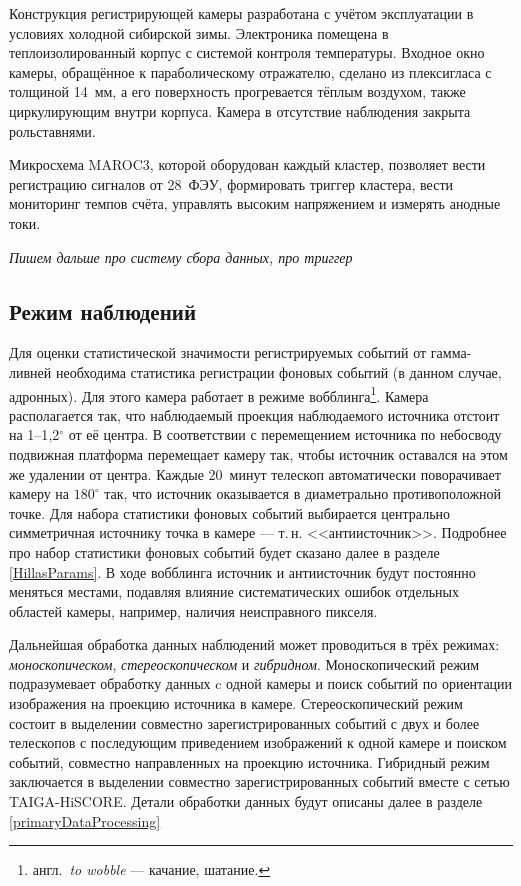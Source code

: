 \documentclass[magd,floatypics,numeref]{msudipl} %
\begin{document}
Конструкция регистрирующей камеры разработана с учётом эксплуатации в условиях холодной сибирской зимы. Электроника помещена в теплоизолированный корпус с системой контроля температуры. Входное окно камеры, обращённое к параболическому отражателю, сделано из плексигласа с толщиной 14~мм, а его поверхность прогревается тёплым воздухом, также циркулирующим внутри корпуса. Камера в отсутствие наблюдения закрыта рольставнями.

Микросхема MAROC3, которой оборудован каждый кластер, позволяет вести регистрацию сигналов от 28~ФЭУ, формировать триггер кластера, вести мониторинг темпов счёта, управлять высоким напряжением и измерять анодные токи. 

\textit{Пишем дальше про систему сбора данных, про триггер}
\subsection{Режим наблюдений}
Для оценки статистической значимости регистрируемых событий от гамма-ливней необходима статистика регистрации фоновых событий (в данном случае, адронных). Для этого камера работает в режиме вобблинга\footnote{англ.~\textit{to wobble} --- качание, шатание.}. Камера располагается так, что наблюдаемый проекция наблюдаемого источника отстоит на 1--1{,}2$^{\circ}$ от её центра. В соответствии с перемещением источника по небосводу подвижная платформа перемещает камеру так, чтобы источник оставался на этом же удалении от центра. Каждые 20~минут телескоп автоматически поворачивает камеру на $180^{\circ}$ так, что источник оказывается в диаметрально противоположной точке. Для набора статистики фоновых событий  выбирается центрально симметричная источнику точка в камере --- т.\,н. <<антиисточник>>. Подробнее про набор статистики фоновых событий будет сказано далее в разделе \ref{HillasParams}. В ходе вобблинга источник и антиисточник будут постоянно меняться местами, подавляя влияние систематических ошибок отдельных областей камеры, например, наличия неисправного пикселя.

Дальнейшая обработка данных наблюдений может проводиться в трёх режимах: \textit{моноскопическом}, \textit{стереоскопическом} и \textit{гибридном}. Моноскопический режим подразумевает обработку данных c одной камеры и поиск событий по ориентации изображения на проекцию источника в камере. Стереоскопический режим состоит в выделении совместно зарегистрированных событий с двух и более телескопов с последующим приведением изображений к одной камере и поиском событий, совместно направленных на проекцию источника. Гибридный режим заключается в выделении совместно зарегистрированных событий вместе с сетью TAIGA-HiSCORE. Детали обработки данных будут описаны далее в разделе \ref{primaryDataProcessing}
\end{document}
